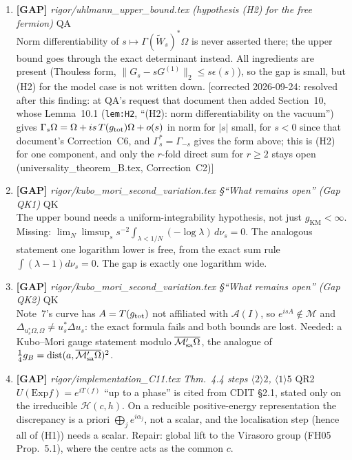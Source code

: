 \documentclass[11pt]{article}
\begin{document}
\begin{enumerate}[leftmargin=1.6em,itemsep=6pt]
\item \textbf{[GAP]} \emph{rigor/uhlmann\_upper\_bound.tex (hypothesis (H2) for the free fermion)} \hfill\textsc{QA}\\ Norm differentiability of \(s\mapsto\Gamma(\widetilde W_s)^*\Omega\) is never asserted there; the upper bound goes through the exact determinant instead. All ingredients are present (Thouless form, \(\lVert G_s-sG^{(1)}\rVert_2\le s\epsilon(s)\)), so the gap is small, but (H2) for the model case is not written down. [corrected 2026-09-24: resolved after this finding: at QA's request that document then added Section~10, whose Lemma~10.1 (\texttt{lem:H2}, ``(H2): norm differentiability on the vacuum'') gives \(\Gamma_s\Omega=\Omega+is\,T(g_{\rm tot})\Omega+o(s)\) in norm for \(|s|\) small, for \(s<0\) since that document's Correction~C6, and \(\Gamma_s^*=\Gamma_{-s}\) gives the form above; this is (H2) for one component, and only the \(r\)-fold direct sum for \(r\ge2\) stays open (universality\_theorem\_B.tex, Correction~C2)]
\item \textbf{[GAP]} \emph{rigor/kubo\_mori\_second\_variation.tex \S``What remains open'' (Gap QK1)} \hfill\textsc{QK}\\ The upper bound needs a uniform-integrability hypothesis, not just \(g_{\mathrm{KM}}<\infty\). Missing: \(\lim_N\limsup_s s^{-2}\int_{\lambda<1/N}(-\log\lambda)\,d\nu_s=0\). The analogous statement one logarithm lower is free, from the exact sum rule \(\int(\lambda-1)d\nu_s=0\). The gap is exactly one logarithm wide.
\item \textbf{[GAP]} \emph{rigor/kubo\_mori\_second\_variation.tex \S``What remains open'' (Gap QK2)} \hfill\textsc{QK}\\ Note~7's curve has \(A=T(g_{\rm tot})\) not affiliated with \(\mathcal A(I)\), so \(e^{isA}\notin\mathcal M\) and \(\Delta_{u_s^*\Omega,\Omega}\ne u_s^*\Delta u_s\): the exact formula fails and both bounds are lost. Needed: a Kubo--Mori gauge statement modulo \(\overline{\mathcal M'_{\rm sa}\Omega}\), the analogue of \(\frac14 g_B=\mathrm{dist}(a,\overline{\mathcal M'_{\rm sa}\Omega})^2\).
\item \textbf{[GAP]} \emph{rigor/implementation\_C11.tex Thm.~4.4 steps \(\langle2\rangle2\), \(\langle1\rangle5\)} \hfill\textsc{QR2}\\ \(U(\mathrm{Exp}f)=e^{iT(f)}\) ``up to a phase'' is cited from CDIT \S2.1, stated only on the irreducible \(\mathcal H(c,h)\). On a reducible positive-energy representation the discrepancy is a priori \(\bigoplus_je^{i\alpha_j}\), not a scalar, and the localisation step (hence all of (H1)) needs a scalar. Repair: global lift to the Virasoro group (FH05 Prop.~5.1), where the centre acts as the common \(c\).

\end{enumerate}
\end{document}
